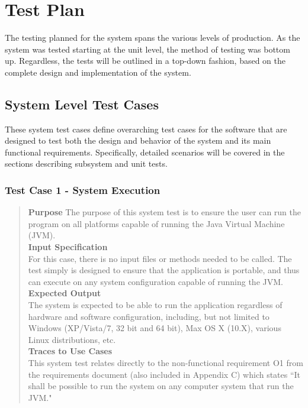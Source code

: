 \documentclass[12pt]{article}
\begin{document}
\section{Test Plan}

{
The testing planned for the system spans the various levels of production. As the system was tested starting at the unit level, the method of testing was bottom up. Regardless, the tests will be outlined in a top-down fashion, based on the complete design and implementation of the system. \\
}

\subsection{System Level Test Cases}
{
These system test cases define overarching test cases for the software that are designed to test both the design and behavior of the system and its main functional requirements. Specifically, detailed scenarios will be covered in the sections describing subsystem and unit tests.
}
\subsubsection{Test Case 1 - System Execution}
\begin{quote}
{\bf Purpose}
{
The purpose of this system test is to ensure the user can run the program on all platforms capable of running the Java Virtual Machine (JVM).
}
\\
{\bf Input Specification}
\\
{
For this case, there is no input files or methods needed to be called. The test simply is designed to ensure that the application is portable, and thus can execute on any system configuration capable of running the JVM.
}
\\
{\bf Expected Output}
\\
{
The system is expected to be able to run the application regardless of hardware and software configuration, including, but not limited to Windows (XP/Vista/7, 32 bit and 64 bit), Max OS X (10.X), various Linux distributions, etc.
}
\\
{\bf Traces to Use Cases}
\\
{
This system test relates directly to the non-functional requirement O1 from the requirements document (also included in Appendix C) which states ``It shall be possible to run the system on any computer system that run the JVM."
}
\end{quote}
\end{document}
